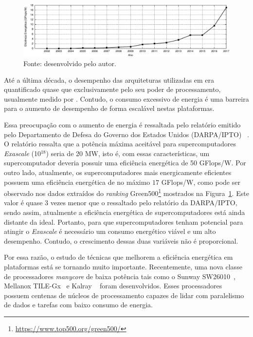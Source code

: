 
\begin{figure}[t]
	\centering
	\caption{Eficiência energética do supercomputador número 1 do \textit{ranking} Green500 (dados extraídos do Green500).}
        \includegraphics[width=\textwidth]{figs/green500.pdf}
    \caption*{Fonte: desenvolvido pelo autor.}
	\label{fig:graphEnergy}
\end{figure}


Até a última década, o desempenho das arquiteturas utilizadas em \hpc era quantificado quase
que exclusivamente pelo seu poder de processamento, usualmente medido por
\flops. Contudo, o consumo excessivo de energia é uma barreira para o aumento de
desempenho de forma escalável nestas plataformas.


Essa preocupação com o aumento de energia é ressaltada pelo relatório emitido
pelo Departamento de Defesa do Governo dos Estados Unidos (DARPA/IPTO)
~\cite{Kogge2008}. O relatório ressalta que a potência máxima aceitável para supercomputadores
\textit{Exascale} (10$^{18}$) seria de 20 MW, isto é, com
essas características, um supercomputador deveria possuir uma eficiência energética de 50 GFlops/W.
Por outro lado, atualmente, os supercomputadores mais energicamente eficientes
possuem uma eficiência energética de no máximo $17$ GFlops/W, como pode ser observado nos dados extraídos do \textit{ranking}
Green500\footnote{\url{https://www.top500.org/green500/}} mostrados na Figura~\ref{fig:graphEnergy}.
Este valor é quase 3 vezes menor que o ressaltado pelo
relatório da DARPA/IPTO, sendo assim, atualmente a eficiência energética de
supercomputadores está ainda distante da ideal. Portanto, para que
supercomputadores tenham potencial para atingir o \textit{Exascale} é necessário
um consumo energético viável e um alto desempenho. Contudo, o crescimento dessas
duas variáveis não é proporcional.


Por essa razão, o estudo de técnicas que melhorem a eficiência energética em
plataformas \hpc está se tornando muito importante.  Recentemente, uma nova
classe de processadores \textit{manycore} de baixa potência tais como o Sunway
SW26010~\cite{sunway:2016}, Mellanox TILE-Gx~\cite{Valero:2012} e Kalray
\mppa~\cite{Castro-IA3:2013} foram desenvolvidos. Esses processadores possuem
centenas de núcleos de processamento capazes de lidar com paralelismo de dados e
tarefas com baixo consumo de energia.

